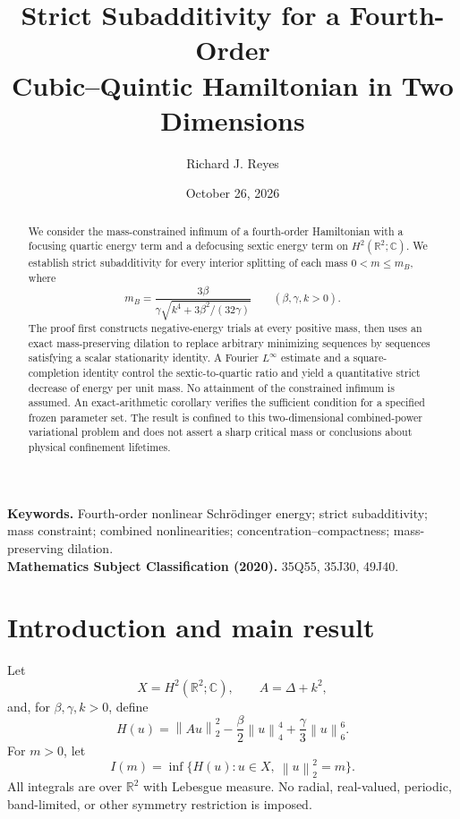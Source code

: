 \documentclass[11pt,letterpaper]{article}
\title{\bfseries Strict Subadditivity for a Fourth-Order\\
Cubic--Quintic Hamiltonian in Two Dimensions}
\author{Richard J. Reyes}
\date{October 26, 2026}
\numberwithin{equation}{section}
\newcommand{\RR}{\mathbb R}
\newcommand{\CC}{\mathbb C}
\newcommand{\norm}[1]{\left\lVert #1\right\rVert}
\begin{document}
\maketitle

\begin{abstract}
We consider the mass-constrained infimum of a fourth-order Hamiltonian with a focusing quartic energy term and a defocusing sextic energy term on $H^2(\RR^2;\CC)$. We establish strict subadditivity for every interior splitting of each mass $0<m\le m_B$, where
\[
  m_B=\frac{3\beta}{\gamma\sqrt{k^4+3\beta^2/(32\gamma)}}
  \qquad (\beta,\gamma,k>0).
\]
The proof first constructs negative-energy trials at every positive mass, then uses an exact mass-preserving dilation to replace arbitrary minimizing sequences by sequences satisfying a scalar stationarity identity. A Fourier $L^\infty$ estimate and a square-completion identity control the sextic-to-quartic ratio and yield a quantitative strict decrease of energy per unit mass. No attainment of the constrained infimum is assumed. An exact-arithmetic corollary verifies the sufficient condition for a specified frozen parameter set. The result is confined to this two-dimensional combined-power variational problem and does not assert a sharp critical mass or conclusions about physical confinement lifetimes.
\end{abstract}

\noindent\textbf{Keywords.} Fourth-order nonlinear Schr\"odinger energy; strict subadditivity; mass constraint; combined nonlinearities; concentration--compactness; mass-preserving dilation.\\
\textbf{Mathematics Subject Classification (2020).} 35Q55, 35J30, 49J40.

\section{Introduction and main result}

Let
\[
  X=H^2(\RR^2;\CC),\qquad A=\Delta+k^2,
\]
and, for $\beta,\gamma,k>0$, define
\begin{equation}\label{eq:H}
  H(u)=\norm{Au}_2^2-\frac{\beta}{2}\norm{u}_4^4
                +\frac{\gamma}{3}\norm{u}_6^6.
\end{equation}
For $m>0$, let
\begin{equation}\label{eq:I}
  I(m)=\inf\bigl\{H(u):u\in X,\ \norm{u}_2^2=m\bigr\}.
\end{equation}
All integrals are over $\RR^2$ with Lebesgue measure. No radial, real-valued, periodic, band-limited, or other symmetry restriction is imposed.
\end{document}

